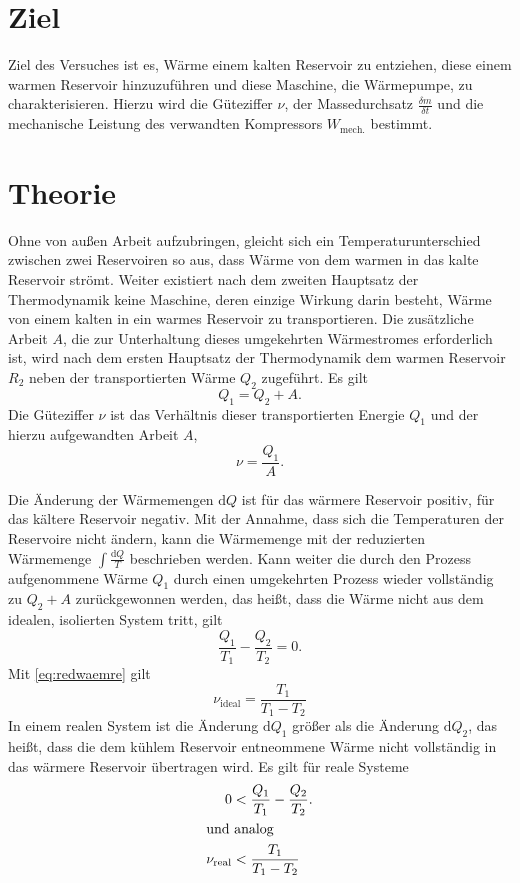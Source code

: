 \section{Ziel}
\label{sec:Ziel}
Ziel des Versuches ist es, Wärme einem kalten Reservoir zu entziehen, diese einem warmen Reservoir hinzuzuführen und diese Maschine, die Wärmepumpe, zu charakterisieren.
Hierzu wird die Güteziffer $\nu$, der Massedurchsatz $\frac{\delta{m}}{\delta{t}}$ und die mechanische Leistung des verwandten Kompressors $W_\text{mech.}$ bestimmt.
\section{Theorie}
\label{sec:Theorie}
Ohne von außen Arbeit aufzubringen, gleicht sich ein Temperaturunterschied zwischen zwei Reservoiren so aus, 
dass Wärme von dem warmen in das kalte Reservoir strömt.
Weiter existiert nach dem zweiten Hauptsatz der Thermodynamik keine Maschine, deren einzige Wirkung darin besteht, Wärme von einem kalten in ein warmes Reservoir zu transportieren\cite{hauptsaetzederthermodynamik}.
Die zusätzliche Arbeit $A$, die zur Unterhaltung dieses umgekehrten Wärmestromes erforderlich ist, wird nach dem ersten Hauptsatz der Thermodynamik dem warmen Reservoir $R_2$ neben der transportierten Wärme $Q_2$ %
zugeführt.
Es gilt\\
\begin{equation}
	Q_1 = Q_2+A.
	\label{eq:waermetransport}
\end{equation}
Die Güteziffer $\nu$ ist das Verhältnis dieser transportierten Energie $Q_1$ und der hierzu aufgewandten Arbeit $A$,
\begin{equation}
	\nu = \frac{Q_1}{A}.
	\label{eq:gueteziffer}
\end{equation}

\noindent Die Änderung der Wärmemengen $\mathup{d}Q$ ist für das wärmere Reservoir positiv, für das kältere Reservoir negativ.
Mit der Annahme, dass sich die Temperaturen der Reservoire nicht ändern, kann die Wärmemenge mit der reduzierten Wärmemenge $\int \frac{\mathup{d}Q}{T}$ beschrieben werden. 
Kann weiter die durch den Prozess aufgenommene Wärme $Q_1$ durch einen umgekehrten Prozess wieder vollständig zu $Q_2 + A$ zurückgewonnen werden, das heißt, dass die Wärme nicht aus dem idealen, isolierten System tritt, gilt
\begin{equation}
	\frac{Q_1}{T_1}-\frac{Q_2}{T_2} = 0.
\label{eq:redwaemre}
\end{equation}
Mit \eqref{eq:redwaemre} gilt 
\begin{equation}
	\nu_{\text{ideal}} = \frac{T_1}{T_1-T_2}
\end{equation}
In einem realen System ist die Änderung $\mathup{d}Q_1$ größer als die Änderung $\mathup{d}Q_2$, das heißt, dass die dem kühlem Reservoir entneommene Wärme nicht vollständig in das wärmere Reservoir übertragen wird.
Es gilt für reale Systeme
\begin{align}
	 0 &< \frac{Q_1}{T_1}-\frac{Q_2}{T_2}.\\
	\intertext{und analog}
	\nu_{\text{real}} &< \frac{T_1}{T_1-T_2}
\end{align}